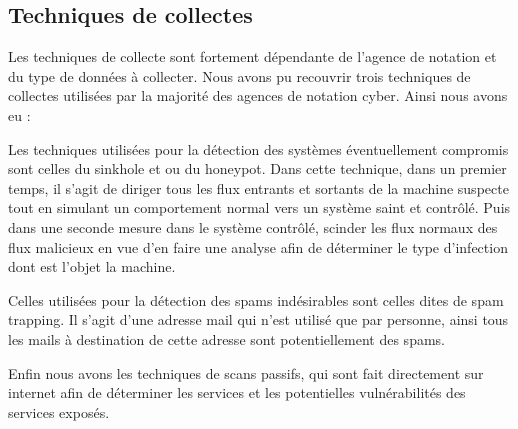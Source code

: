 \documentclass[a4paper,12pt]{book}
\theoremstyle{break}
\begin{document}
\subsection{Techniques de collectes}
Les techniques de collecte sont fortement dépendante de l'agence de notation et du type de données à collecter. Nous avons pu recouvrir trois techniques de collectes utilisées par la majorité des agences de notation cyber. Ainsi nous avons eu :

Les techniques utilisées pour la détection des systèmes éventuellement compromis sont celles du sinkhole et ou du honeypot. Dans cette technique, dans un premier temps, il s’agit de diriger tous les flux entrants et sortants de la machine suspecte tout en simulant un comportement normal vers un système saint et contrôlé. Puis dans une seconde mesure dans le système contrôlé, scinder les flux normaux des flux malicieux en vue d'en faire une analyse afin de déterminer le type d’infection dont est l'objet la machine.


Celles utilisées pour la détection des spams indésirables sont celles dites de spam trapping. Il s'agit d'une adresse mail qui n’est utilisé que par personne, ainsi tous les mails à destination de cette adresse sont potentiellement des spams. 

Enfin nous avons les techniques de scans passifs, qui sont fait directement sur internet afin de déterminer les services et les potentielles vulnérabilités des services exposés.
\end{document}
